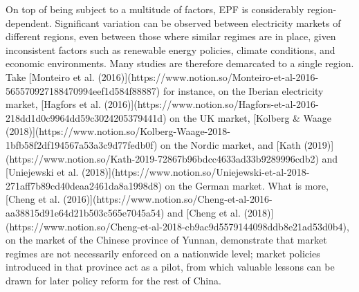 On top of being subject to a multitude of factors, EPF is considerably region-dependent. Significant variation can be observed between electricity markets of different regions, even between those where similar regimes are in place, given inconsistent factors such as renewable energy policies, climate conditions, and economic environments. Many studies are therefore demarcated to a single region. Take [Monteiro et al. (2016)](https://www.notion.so/Monteiro-et-al-2016-565570927188470994eef1d584f88887) for instance, on the Iberian electricity market, [Hagfors et al. (2016)](https://www.notion.so/Hagfors-et-al-2016-218dd1d0c9964dd59c3024205379441d) on the UK market, [Kolberg \& Waage (2018)](https://www.notion.so/Kolberg-Waage-2018-1bfb58f2df194567a53a3c9d77fedb0f) on the Nordic market, and [Kath (2019)](https://www.notion.so/Kath-2019-72867b96bdcc4633ad33b9289996cdb2) and [Uniejewski et al. (2018)](https://www.notion.so/Uniejewski-et-al-2018-271aff7b89cd40deaa2461da8a1998d8) on the German market. What is more, [Cheng et al. (2016)](https://www.notion.so/Cheng-et-al-2016-aa38815d91e64d21b503c565e7045a54) and [Cheng et al. (2018)](https://www.notion.so/Cheng-et-al-2018-cb9ac9d5579144098ddb8e21ad53d0b4), on the market of the Chinese province of Yunnan, demonstrate that market regimes are not necessarily enforced on a nationwide level; market policies introduced in that province act as a pilot, from which valuable lessons can be drawn for later policy reform for the rest of China.

